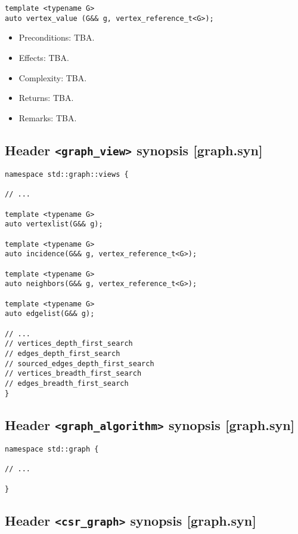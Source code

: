 \documentclass[10pt,onecolumn]{article}
\newcommand{\tcode}[1]{\lstinline[breaklines=true]{#1}}
\begin{document}
\vspace{10pt}

\begin{lstlisting}
template <typename G>
auto vertex_value (G&& g, vertex_reference_t<G>);
\end{lstlisting}
%
\begin{itemize}
\item Preconditions: TBA.
\item Effects: TBA.
\item Complexity: TBA.
\item Returns: TBA.
\item Remarks: TBA.
\end{itemize}

\subsection{Header \tcode{<graph_view>} synopsis [graph.syn]}

\begin{lstlisting}
namespace std::graph::views {

// ...

template <typename G>
auto vertexlist(G&& g);

template <typename G>
auto incidence(G&& g, vertex_reference_t<G>);

template <typename G>
auto neighbors(G&& g, vertex_reference_t<G>);

template <typename G>
auto edgelist(G&& g);

// ...
// vertices_depth_first_search
// edges_depth_first_search
// sourced_edges_depth_first_search
// vertices_breadth_first_search
// edges_breadth_first_search
}
\end{lstlisting}

\subsection{Header \tcode{<graph_algorithm>} synopsis [graph.syn]}

\begin{lstlisting}
namespace std::graph {

// ...

}
\end{lstlisting}

\subsection{Header \tcode{<csr_graph>} synopsis [graph.syn]}
\end{document}
